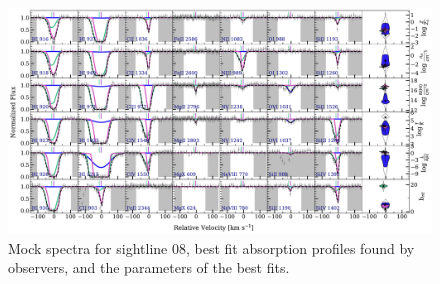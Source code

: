 \documentclass[fleqn,usenatbib]{mnras}
\begin{document}
\begin{figure}
    \centering
    \includegraphics[width=\textwidth]{figures/sample2/best_fits/0008.pdf}
    \caption{
    Mock spectra for sightline 08,
    best fit absorption profiles found by observers,
    and the parameters of the best fits.
    }
    \label{f: sample2 spectrum 08}
\end{figure}
\end{document}
